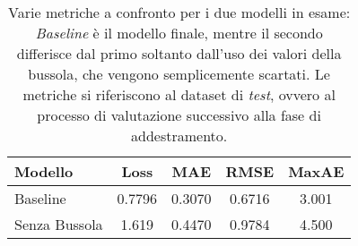\begin{table}[tbp]
  \centering
  \begin{tabular}{lcccc}
    \toprule
    Modello & Loss & MAE & RMSE & MaxAE \\
    \midrule
    Baseline      & 0.7796 & 0.3070 & 0.6716 & 3.001 \\
    Senza Bussola & 1.619 & 0.4470 & 0.9784 & 4.500 \\
    \bottomrule
  \end{tabular}
  \caption{Varie metriche a confronto per i due modelli in esame:
    \emph{Baseline} è il modello finale, mentre il secondo differisce dal primo
    soltanto dall'uso dei valori della bussola, che vengono semplicemente
    scartati. Le metriche si riferiscono al dataset di \emph{test}, ovvero al
    processo di valutazione successivo alla fase di addestramento.}%
  \label{tab:nocompass}%
\end{table}

